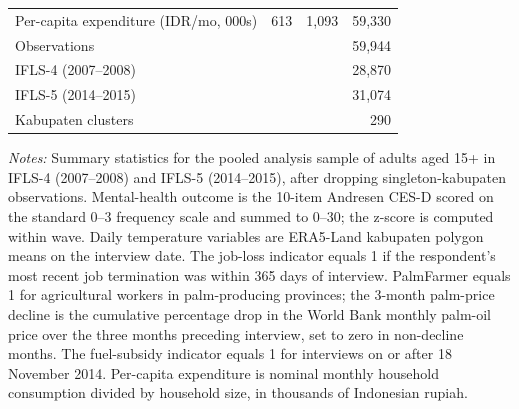 \begin{table}[!htbp]
\begin{threeparttable}
\begin{tabular}{l*{3}{r}}
\quad Per-capita expenditure (IDR/mo, 000s) & 613 & 1,093 & 59,330 \\
\addlinespace[4pt]
\midrule
Observations &  &  & 59,944 \\
\quad IFLS-4 (2007--2008) &  &  & 28,870 \\
\quad IFLS-5 (2014--2015) &  &  & 31,074 \\
\quad Kabupaten clusters &  &  & 290 \\
\bottomrule
\end{tabular}
\begin{tablenotes}[flushleft]
\footnotesize
\item \textit{Notes:} Summary statistics for the pooled analysis sample of adults aged 15+ in IFLS-4 (2007--2008) and IFLS-5 (2014--2015), after dropping singleton-kabupaten observations. Mental-health outcome is the 10-item Andresen CES-D scored on the standard 0--3 frequency scale and summed to 0--30; the z-score is computed within wave. Daily temperature variables are ERA5-Land kabupaten polygon means on the interview date. The job-loss indicator equals 1 if the respondent's most recent job termination was within 365 days of interview. PalmFarmer equals 1 for agricultural workers in palm-producing provinces; the 3-month palm-price decline is the cumulative percentage drop in the World Bank monthly palm-oil price over the three months preceding interview, set to zero in non-decline months. The fuel-subsidy indicator equals 1 for interviews on or after 18 November 2014. Per-capita expenditure is nominal monthly household consumption divided by household size, in thousands of Indonesian rupiah.
\end{tablenotes}
\end{threeparttable}
\end{table}

